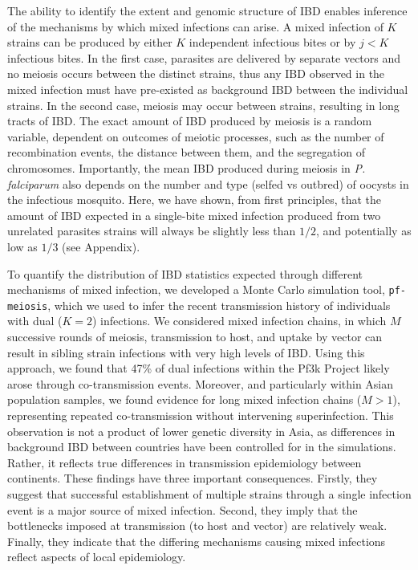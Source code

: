 \documentclass[9pt,lineno]{elife}
\begin{document}
The ability to identify the extent and genomic structure of IBD enables inference of the mechanisms by which mixed infections can arise.  A mixed infection of $K$ strains can be produced by either $K$ independent infectious bites or by $j < K$ infectious bites. In the first case, parasites are delivered by separate vectors and no meiosis occurs between the distinct strains, thus any IBD observed in the mixed infection must have pre-existed as background IBD between the individual strains.  In the second case, meiosis may occur between strains, resulting in long tracts of IBD.  The exact amount of IBD produced by meiosis is a random variable, dependent on outcomes of meiotic processes, such as the number of recombination events, the distance between them, and the segregation of chromosomes.  Importantly, the mean IBD produced during meiosis in \textit{P. falciparum} also depends on the number and type (selfed vs outbred) of oocysts in the infectious mosquito.  Here, we have shown, from first principles, that the amount of IBD expected in a single-bite mixed infection produced from two unrelated parasites strains will always be slightly less than $1/2$, and potentially as low as $1/3$ (see Appendix).

To quantify the distribution of IBD statistics expected through different mechanisms of mixed infection, we developed a Monte Carlo simulation tool, \texttt{pf-meiosis}, which we used to infer the recent transmission history of individuals with dual ($K=2$) infections.  We considered mixed infection chains, in which $M$ successive rounds of meiosis, transmission to host, and uptake by vector can result in sibling strain infections with very high levels of IBD.  Using this approach, we found that 47\% of dual infections within the Pf3k Project likely arose through co-transmission events. Moreover, and particularly within Asian population samples, we found evidence for long mixed infection chains ($M>1$), representing repeated co-transmission without intervening superinfection.  This observation is not a product of lower genetic diversity in Asia, as differences in background IBD between countries have been controlled for in the simulations. Rather, it reflects true differences in transmission epidemiology between continents. These findings have three important consequences. Firstly, they suggest that successful establishment of multiple strains through a single infection event is a major source of mixed infection.  Second, they imply that the bottlenecks imposed at transmission (to host and vector) are relatively weak.  Finally, they indicate that the differing mechanisms causing mixed infections reflect aspects of local epidemiology.
\end{document}
